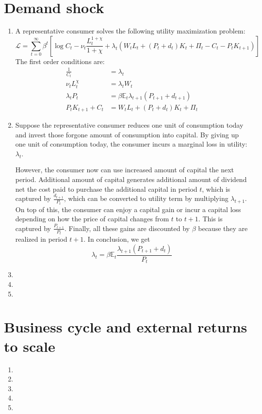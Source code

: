 \documentclass[11pt]{amsart}
\begin{document}
\section{Demand shock}
\begin{enumerate}[label=(\alph*)]
	\item A representative consumer solves the following utility maximization problem: 
	\begin{equation*}
	\mathcal{L} = \sum_{t=0}^{\infty} \beta^t \left[ \log C_t - \nu_t \frac{L_t^{1 +\chi}}{1+\chi} + \lambda_t \left( W_t L_t + (P_t + d_t) K_t + \Pi_t - C_t - P_t K_{t+1} \right) \right]
	\end{equation*}
	The first order conditions are: 
	\begin{align*}
	\frac{1}{C_t} &= \lambda_t \\
	\nu_t L_t^\chi &= \lambda_t W_t \\
	\lambda_t P_t &= \beta \mathbb{E}_t \lambda_{t+1} \left(  P_{t+1} + d_{t+1} \right)  \\
	P_t K_{t+1} + C_t & = W_t L_t + (P_t + d_t) K_t + \Pi_t
	\end{align*}
	
	\item Suppose the representative consumer reduces one unit of consumption today and invest those forgone amount of consumption into capital. By giving up one unit of consumption today, the consumer incurs a marginal loss in utility: $\lambda_t$. 
	
	However, the consumer now can use increased amount of capital the next period. Additional amount of capital generates additional amount of dividend net the cost paid to purchase the additional capital in period $t$, which is captured by $\frac{d_{t+1}}{P_t}$, which can be converted to utility term by multiplying $\lambda_{t+1}$. On top of this, the consumer can enjoy a capital gain or incur a capital loss depending on how the price of capital changes from $t$ to $t+1$. This is captured by $\frac{P_{t+1}}{P_t}$. Finally, all these gains are discounted by $\beta$ because they are realized in period $t+1$. In conclusion, we get 
	\begin{equation*}
	\lambda_t = \beta \mathbb{E}_t \frac{\lambda_{t+1} (P_{t+1} + d_t)}{P_t}
	\end{equation*}
	
	\item
	\item
	\item
\end{enumerate}
\section{Business cycle and external returns to scale}
\begin{enumerate}[label=(\alph*)]
	\item 
	\item
	\item
	\item
	\item
\end{enumerate}
\end{document}
